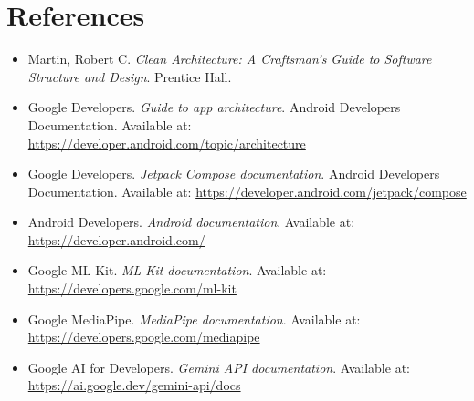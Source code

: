 \documentclass[12pt,a4paper]{article}
\begin{document}
\newpage








\section{References}
\begin{itemize}
    \item Martin, Robert C. \textit{Clean Architecture: A Craftsman's Guide to Software Structure and Design}. Prentice Hall.
    \item Google Developers. \textit{Guide to app architecture}. Android Developers Documentation. Available at: \url{https://developer.android.com/topic/architecture}
    \item Google Developers. \textit{Jetpack Compose documentation}. Android Developers Documentation. Available at: \url{https://developer.android.com/jetpack/compose}
    \item Android Developers. \textit{Android documentation}. Available at: \url{https://developer.android.com/}
    \item Google ML Kit. \textit{ML Kit documentation}. Available at: \url{https://developers.google.com/ml-kit}
    \item Google MediaPipe. \textit{MediaPipe documentation}. Available at: \url{https://developers.google.com/mediapipe}
    \item Google AI for Developers. \textit{Gemini API documentation}. Available at: \url{https://ai.google.dev/gemini-api/docs}
\end{itemize}
\end{document}
